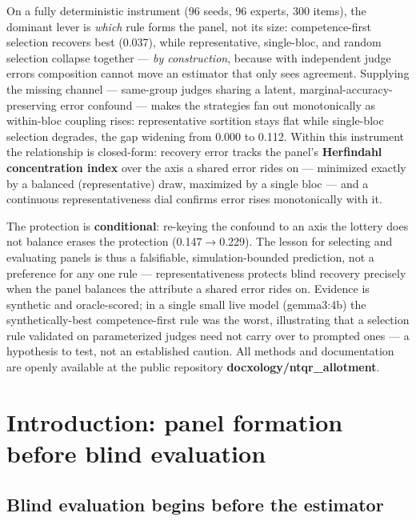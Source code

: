 \documentclass[
]{article}
\begin{document}
On a fully deterministic instrument (96 seeds, 96 experts, 300 items),
the dominant lever is \emph{which} rule forms the panel, not its size:
competence-first selection recovers best (0.037), while representative,
single-bloc, and random selection collapse together --- \emph{by
construction}, because with independent judge errors composition cannot
move an estimator that only sees agreement. Supplying the missing
channel --- same-group judges sharing a latent,
marginal-accuracy-preserving error confound --- makes the strategies fan
out monotonically as within-bloc coupling rises: representative
sortition stays flat while single-bloc selection degrades, the gap
widening from 0.000 to 0.112. Within this instrument the relationship is
closed-form: recovery error tracks the panel's \textbf{Herfindahl
concentration index} over the axis a shared error rides on --- minimized
exactly by a balanced (representative) draw, maximized by a single bloc
--- and a continuous representativeness dial confirms error rises
monotonically with it.

The protection is \textbf{conditional}: re-keying the confound to an
axis the lottery does not balance erases the protection (0.147\texorpdfstring{\ensuremath{\to}}{->}0.229).
The lesson for selecting and evaluating panels is thus a falsifiable,
simulation-bounded prediction, not a preference for any one rule ---
representativeness protects blind recovery precisely when the panel
balances the attribute a shared error rides on. Evidence is synthetic
and oracle-scored; in a single small live model (gemma3:4b) the
synthetically-best competence-first rule was the worst, illustrating
that a selection rule validated on parameterized judges need not carry
over to prompted ones --- a hypothesis to test, not an established
caution. All methods and documentation are openly available at the
public repository \textbf{docxology/ntqr\_allotment}.

\newpage

\section{Introduction: panel formation before blind
evaluation}\label{introduction-panel-formation-before-blind-evaluation}

\subsection{Blind evaluation begins before the
estimator}\label{blind-evaluation-begins-before-the-estimator}
\end{document}
